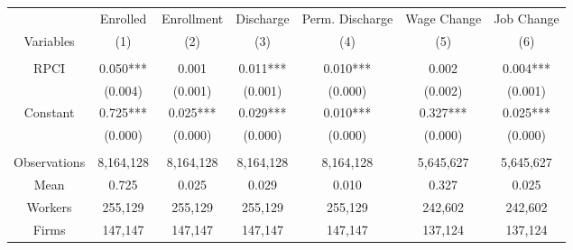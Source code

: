 \begin{tabular}{c|cccccc}
\toprule
\toprule
      & Enrolled & Enrollment & Discharge & Perm. Discharge & Wage Change & Job Change \\
Variables & \multicolumn{1}{p{7.085em}}{(1)} & \multicolumn{1}{p{7.085em}}{(2)} & \multicolumn{1}{p{7.085em}}{(3)} & \multicolumn{1}{p{7.085em}}{(4)} & \multicolumn{1}{p{7.085em}}{(5)} & \multicolumn{1}{p{7.085em}}{(6)} \\
\midrule
      &       &       &       &       &       &  \\
RPCI  & \multicolumn{1}{p{7.085em}}{0.050***} & 0.001 & \multicolumn{1}{p{7.085em}}{0.011***} & \multicolumn{1}{p{7.085em}}{0.010***} & 0.002 & \multicolumn{1}{p{7.085em}}{0.004***} \\
      & (0.004) & (0.001) & (0.001) & (0.000) & (0.002) & (0.001) \\
Constant & \multicolumn{1}{p{7.085em}}{0.725***} & \multicolumn{1}{p{7.085em}}{0.025***} & \multicolumn{1}{p{7.085em}}{0.029***} & \multicolumn{1}{p{7.085em}}{0.010***} & \multicolumn{1}{p{7.085em}}{0.327***} & \multicolumn{1}{p{7.085em}}{0.025***} \\
      & (0.000) & (0.000) & (0.000) & (0.000) & (0.000) & (0.000) \\
      &       &       &       &       &       &  \\
\midrule
Observations & 8,164,128 & 8,164,128 & 8,164,128 & 8,164,128 & 5,645,627 & 5,645,627 \\
Mean  & 0.725 & 0.025 & 0.029 & 0.010 & 0.327 & 0.025 \\
Workers & 255,129 & 255,129 & 255,129 & 255,129 & 242,602 & 242,602 \\
Firms & 147,147 & 147,147 & 147,147 & 147,147 & 137,124 & 137,124 \\
\bottomrule
\bottomrule
\end{tabular}%
